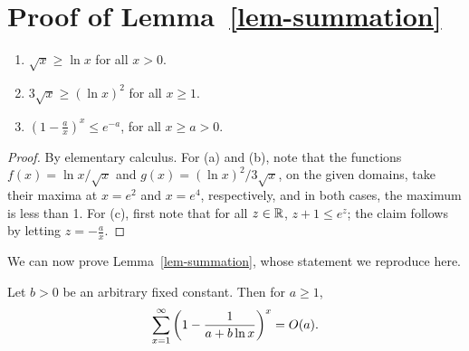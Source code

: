 \section[Proof of Lemma 8.6]{Proof of Lemma~\ref{lem-summation}}\label{app-d}

\begin{lemma}\label{lem-calculus}
  \begin{enumerate}\alphalabels
  \item\label{lem-calculus-b} $\sqrt x\geq\ln x$ for all $x>0$.
  \item\label{lem-calculus-c} $3\sqrt x\geq(\ln x)^2$ for all $x\geq 1$.
  \item\label{lem-calculus-d} $(1-\frac{a}{x})^x \leq e^{-a}$, for all
    $x\geq a>0$.
  \end{enumerate}
\end{lemma}

\begin{proof}
  By elementary calculus. For (a) and (b), note that the functions
  $f(x)={\ln x}/{\sqrt x}$ and $g(x)={(\ln x)^2}/{3\sqrt x}$, on the
  given domains, take their maxima at $x=e^2$ and $x=e^4$,
  respectively, and in both cases, the maximum is less than 1. 
  For (c), first note that for all $z\in{\mathbb{R}}$, $z+1\leq e^z$; the claim
  follows by letting $z=-\frac{a}{x}$.
\end{proof}

We can now prove Lemma~\ref{lem-summation}, whose statement we reproduce 
here.

\begin{un-lemma}
  Let $b>0$ be an arbitrary fixed constant. Then for $a\geq 1$,
  \[ \sum_{x=1}^{\infty} \left(1-\frac{1}{a+b\ln x}\right)^x = O(a).
  \]
\end{un-lemma}

